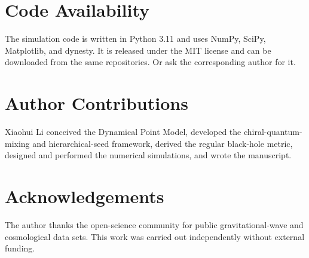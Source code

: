 \documentclass[11pt,a4paper]{article}
\begin{document}
\section{Code Availability}

The simulation code is written in Python 3.11 and uses NumPy, SciPy, Matplotlib, and dynesty. It is released under the MIT license and can be downloaded from the same repositories. Or ask the corresponding author for it.

\section{Author Contributions}

Xiaohui Li conceived the Dynamical Point Model, developed the chiral-quantum-mixing and hierarchical-seed framework, derived the regular black-hole metric, designed and performed the numerical simulations, and wrote the manuscript.

\section{Acknowledgements}

The author thanks the open-science community for public gravitational-wave and cosmological data sets. This work was carried out independently without external funding.
\end{document}
